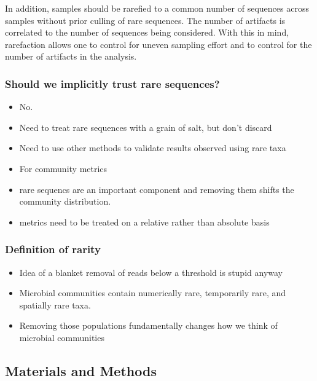 \documentclass[]{article}
\begin{document}
In addition, samples should be rarefied to a common number of sequences
across samples without prior culling of rare sequences. The number of
artifacts is correlated to the number of sequences being considered.
With this in mind, rarefaction allows one to control for uneven sampling
effort and to control for the number of artifacts in the analysis.

\subsubsection{Should we implicitly trust rare
sequences?}\label{should-we-implicitly-trust-rare-sequences}

\begin{itemize}
\itemsep1pt\parskip0pt
\item
  No.
\item
  Need to treat rare sequences with a grain of salt, but don't discard
\item
  Need to use other methods to validate results observed using rare taxa
\item
  For community metrics
\item
  rare sequencs are an important component and removing them shifts the
  community distribution.
\item
  metrics need to be treated on a relative rather than absolute basis
\end{itemize}

\subsubsection{Definition of rarity}\label{definition-of-rarity}

\begin{itemize}
\itemsep1pt\parskip0pt
\item
  Idea of a blanket removal of reads below a threshold is stupid anyway
\item
  Microbial communities contain numerically rare, temporarily rare, and
  spatially rare taxa.
\item
  Removing those populations fundamentally changes how we think of
  microbial communities
\end{itemize}

\newpage

\subsection{Materials and Methods}\label{materials-and-methods}
\end{document}

